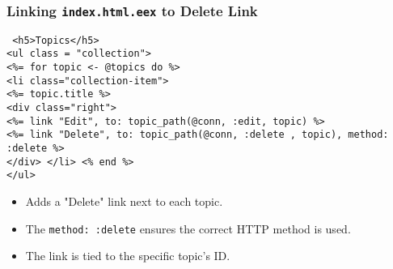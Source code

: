 \documentclass[aspectratio=169, table]{beamer}
\begin{document}
	\begin{frame}
		\frametitle{Linking \texttt{index.html.eex} to Delete Link}
		\texttt{
			<h5>Topics</h5>\\
			<ul class = "collection">\\
			<\%= for topic <- @topics do \%>\\
			<li class="collection-item"> \\
			<\%= topic.title \%>\\
			<div class="right">\\
			<\%= link "Edit", to: topic\_path(@conn, :edit, topic) \%>\\
			<\%= link "Delete", to: topic\_path(@conn, :delete , topic), method: :delete \%>\\
			</div>
			</li>
			<\% end \%> \\
			</ul>
		}
		
		\begin{itemize}
			\item Adds a "Delete" link next to each topic.
			\item The \texttt{method: :delete} ensures the correct HTTP method is used.
			\item The link is tied to the specific topic’s ID.
		\end{itemize}
	\end{frame}
	
\end{document}
